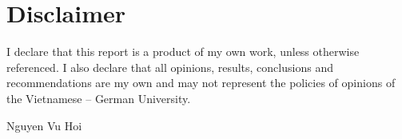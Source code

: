 \documentclass[pdftex,12pt,a4paper]{article}
\begin{document}
  
  
  
  \newpage
  \tableofcontents
  \newpage
  \listoffigures
  
  \setlength{\parindent}{0em}
  \setlength{\parskip}{1em}
  
  \newpage
  \section*{Disclaimer}
  I declare that this report is a product of my own work, unless otherwise referenced. I also declare that all opinions, results, conclusions and recommendations are my own and may not represent the policies of opinions of the Vietnamese – German University.~\\[4cm]
  \begin{flushright}
  Nguyen Vu Hoi
  \end{flushright}
  
  \newpage
\end{document}
